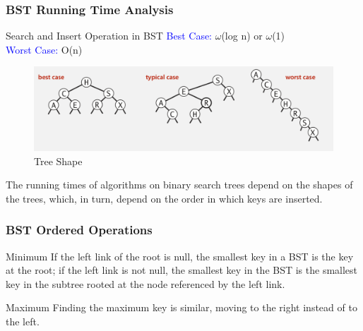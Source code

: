 \documentclass[11pt]{beamer}
\begin{document}
     \begin{frame}[fragile]
    	\frametitle{BST Running Time Analysis}
    	\begin{block}{Search and Insert Operation in BST}
    		\textcolor{blue}{Best Case:} $\omega$(log n) or  $\omega$(1)\\
    		\textcolor{blue}{Worst Case:} O(n)
    	\end{block}
        \begin{figure}
        	\centering
        	\includegraphics[width=1.001\linewidth]{"Screenshot 2020-11-03 at 10.19.11 PM"}
        	\caption{Tree Shape}
        	\label{fig:screenshot-2020-11-03-at-10}
        \end{figure}
        \alert{The running times of algorithms on binary
        	search trees depend on the shapes of the trees, which, in turn, depend on the order in which keys are inserted.}
    \end{frame}

    \begin{frame}[fragile]
    	\frametitle{BST Ordered Operations}
    	\begin{exampleblock}{Minimum}
    		If the left link of the root is null, the smallest key in a BST is the key at the root; if the left link is not null, the smallest key in the BST is the smallest key in the subtree rooted at the node referenced by the left link.
    	\end{exampleblock}
        \begin{exampleblock}{Maximum}
        	Finding the maximum key is similar, moving to the right instead of to the left.
        \end{exampleblock}
    \end{frame}
 
\end{document}
